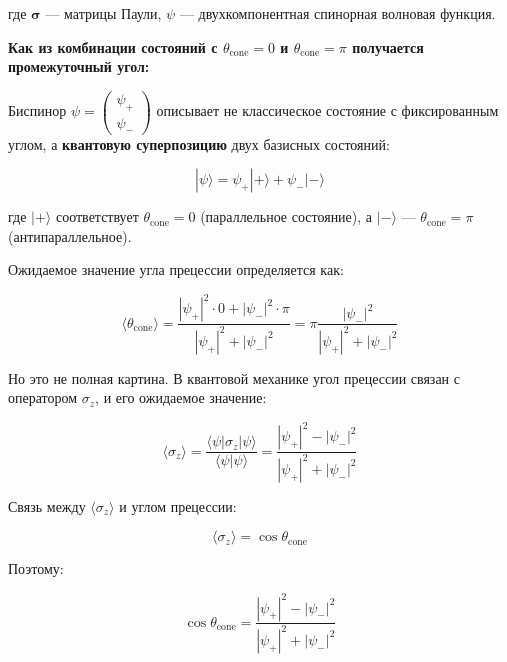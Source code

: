 \documentclass[12pt]{article}
\begin{document}
где $\boldsymbol{\sigma}$ — матрицы Паули, $\psi$ — двухкомпонентная спинорная волновая функция.

\textbf{Как из комбинации состояний с $\theta_{\text{cone}} = 0$ и $\theta_{\text{cone}} = \pi$ получается промежуточный угол:}

Биспинор $\psi = \begin{pmatrix} \psi_+ \\ \psi_- \end{pmatrix}$ описывает не классическое состояние с фиксированным углом, а \textbf{квантовую суперпозицию} двух базисных состояний:

\begin{equation}
|\psi\rangle = \psi_+ |+\rangle + \psi_- |-\rangle
\label{eq:superposition}
\end{equation}

где $|+\rangle$ соответствует $\theta_{\text{cone}} = 0$ (параллельное состояние), а $|-\rangle$ — $\theta_{\text{cone}} = \pi$ (антипараллельное).

Ожидаемое значение угла прецессии определяется как:

\begin{equation}
\langle \theta_{\text{cone}} \rangle = \frac{|\psi_+|^2 \cdot 0 + |\psi_-|^2 \cdot \pi}{|\psi_+|^2 + |\psi_-|^2} = \pi \frac{|\psi_-|^2}{|\psi_+|^2 + |\psi_-|^2}
\label{eq:expected_theta}
\end{equation}

Но это не полная картина. В квантовой механике угол прецессии связан с оператором $\sigma_z$, и его ожидаемое значение:

\begin{equation}
\langle \sigma_z \rangle = \frac{\langle \psi | \sigma_z | \psi \rangle}{\langle \psi | \psi \rangle} = \frac{|\psi_+|^2 - |\psi_-|^2}{|\psi_+|^2 + |\psi_-|^2}
\label{eq:sigma_z_expectation}
\end{equation}

Связь между $\langle \sigma_z \rangle$ и углом прецессии:

\begin{equation}
\langle \sigma_z \rangle = \cos\theta_{\text{cone}}
\label{eq:sigma_cos_theta}
\end{equation}

Поэтому:

\begin{equation}
\cos\theta_{\text{cone}} = \frac{|\psi_+|^2 - |\psi_-|^2}{|\psi_+|^2 + |\psi_-|^2}
\label{eq:cos_theta_psi}
\end{equation}
\end{document}
